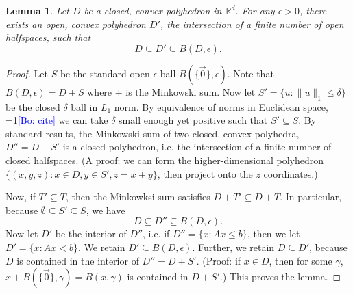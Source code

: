 \documentclass{article}
\newcommand{\Comments}{1}
\newcommand{\mynote}[2]{\ifnum\Comments=1\textcolor{#1}{#2}\fi}
\newcommand{\bo}[1]{\mynote{blue}{[Bo: #1]}}
\newcommand{\reals}{\mathbb{R}}
\newtheorem{lemma}{Lemma}
\theoremstyle{definition}
\begin{document}
\begin{lemma} \label{lemma:enclose-halfspaces}
  Let $D$ be a closed, convex polyhedron in $\reals^d$.
  For any $\epsilon > 0$, there exists an open, convex polyhedron $D'$, the intersection of a finite number of open halfspaces, such that
    \[ D \subseteq D' \subseteq B(D,\epsilon) . \]
\end{lemma}
\begin{proof}
  Let $S$ be the standard open $\epsilon$-ball $B(\{\vec{0}\},\epsilon)$.
  Note that $B(D,\epsilon) = D + S$ where $+$ is the Minkowski sum.
  Now let $S' = \{u : \|u\|_1 \leq \delta\}$ be the closed $\delta$ ball in $L_1$ norm.
  By equivalence of norms in Euclidean space, \bo{cite} we can take $\delta$ small enough yet positive such that $S' \subseteq S$.
  By standard results, the Minkowski sum of two closed, convex polyhedra, $D'' = D + S'$ is a closed polyhedron, i.e. the intersection of a finite number of closed halfspaces. (A proof: we can form the higher-dimensional polyhedron $\{(x,y,z) : x \in D, y \in S', z = x+y\}$, then project onto the $z$ coordinates.)

  Now, if $T' \subseteq T$, then the Minkowksi sum satisfies $D + T' \subseteq D + T$.
  In particular, because $\emptyset \subseteq S' \subseteq S$, we have
    \[ D \subseteq D'' \subseteq B(D,\epsilon) . \]
  Now let $D'$ be the interior of $D''$, i.e. if $D'' = \{x : Ax \leq b\}$, then we let $D' = \{x: Ax < b\}$.
  We retain $D' \subseteq B(D,\epsilon)$.
  Further, we retain $D \subseteq D'$, because $D$ is contained in the interior of $D'' = D + S'$.
  (Proof: if $x \in D$, then for some $\gamma$, $x + B(\{\vec{0}\},\gamma) = B(x,\gamma)$ is contained in $D + S'$.)
  This proves the lemma.
\end{proof}
\end{document}

